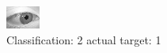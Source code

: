 \begin{figure}[h!]
\begin{center}
\includegraphics[width=0.60\columnwidth]{figures/ID2776_class_2_target_1.png}
\end{center}
\caption{ Classification: 2 actual target: 1}
\label{fig:ID2776_class_2_target_1}
\end{figure}
